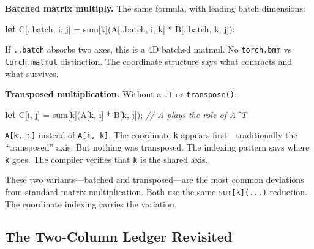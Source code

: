 \documentclass[11pt,titlepage]{article}
\newenvironment{Shaded}{}{}
\newcommand{\CommentTok}[1]{\textcolor[rgb]{0.38,0.63,0.69}{\textit{#1}}}
\newcommand{\KeywordTok}[1]{\textcolor[rgb]{0.00,0.44,0.13}{\textbf{#1}}}
\newcommand{\NormalTok}[1]{#1}
\newcommand{\OperatorTok}[1]{\textcolor[rgb]{0.40,0.40,0.40}{#1}}
\begin{document}
\textbf{Batched matrix multiply.} The same formula, with leading batch
dimensions:

\begin{Shaded}
\begin{Highlighting}[]
\KeywordTok{let}\NormalTok{ C}\OperatorTok{[}\NormalTok{..batch, i, j}\OperatorTok{]}\NormalTok{ = sum}\OperatorTok{[}\NormalTok{k}\OperatorTok{]}\NormalTok{(A}\OperatorTok{[}\NormalTok{..batch, i, k}\OperatorTok{]}\NormalTok{ * B}\OperatorTok{[}\NormalTok{..batch, k, j}\OperatorTok{]}\NormalTok{);}
\end{Highlighting}
\end{Shaded}

If \texttt{..batch} absorbs two axes, this is a 4D batched matmul. No
\texttt{torch.bmm} vs \texttt{torch.matmul} distinction. The coordinate
structure says what contracts and what survives.

\textbf{Transposed multiplication.} Without a \texttt{.T} or
\texttt{transpose()}:

\begin{Shaded}
\begin{Highlighting}[]
\KeywordTok{let}\NormalTok{ C}\OperatorTok{[}\NormalTok{i, j}\OperatorTok{]}\NormalTok{ = sum}\OperatorTok{[}\NormalTok{k}\OperatorTok{]}\NormalTok{(A}\OperatorTok{[}\NormalTok{k, i}\OperatorTok{]}\NormalTok{ * B}\OperatorTok{[}\NormalTok{k, j}\OperatorTok{]}\NormalTok{);  }\CommentTok{// A plays the role of A^T}
\end{Highlighting}
\end{Shaded}

\texttt{A{[}k,\ i{]}} instead of \texttt{A{[}i,\ k{]}}. The coordinate
\texttt{k} appears first---traditionally the ``transposed'' axis. But
nothing was transposed. The indexing pattern says where \texttt{k} goes.
The compiler verifies that \texttt{k} is the shared axis.

These two variants---batched and transposed---are the most common
deviations from standard matrix multiplication. Both use the same
\texttt{sum{[}k{]}(...)} reduction. The coordinate indexing carries the
variation.

\vspace{2em}

\hypertarget{the-two-column-ledger-revisited}{%
\subsection{The Two-Column Ledger
Revisited}\label{the-two-column-ledger-revisited}}
\end{document}
